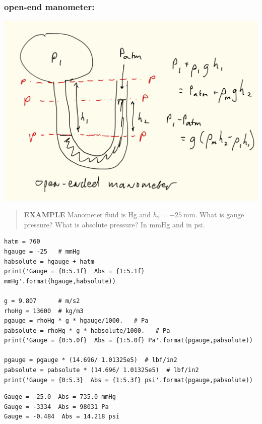 \documentclass[11pt]{article}
\begin{document}
\subsubsection{open-end manometer:}
\label{sec-4-6-4}
\includegraphics[width=.9\linewidth]{./figs/Manometer-open.png}
\begin{quote}
\textbf{EXAMPLE} Manometer fluid is Hg and \(h_{2} = -\SI{25}{\mm}\).  What is gauge pressure?  What is absolute pressure? In mmHg and in psi.
\end{quote}
\begin{verbatim}
hatm = 760
hgauge = -25   # mmHg
habsolute = hgauge + hatm
print('Gauge = {0:5.1f}  Abs = {1:5.1f} mmHg'.format(hgauge,habsolute))

g = 9.807      # m/s2
rhoHg = 13600  # kg/m3
pgauge = rhoHg * g * hgauge/1000.   # Pa
pabsolute = rhoHg * g * habsolute/1000.   # Pa
print('Gauge = {0:5.0f}  Abs = {1:5.0f} Pa'.format(pgauge,pabsolute))

pgauge = pgauge * (14.696/ 1.01325e5)  # lbf/in2
pabsolute = pabsolute * (14.696/ 1.01325e5)  # lbf/in2
print('Gauge = {0:5.3}  Abs = {1:5.3f} psi'.format(pgauge,pabsolute))
\end{verbatim}

\begin{verbatim}
Gauge = -25.0  Abs = 735.0 mmHg
Gauge = -3334  Abs = 98031 Pa
Gauge = -0.484  Abs = 14.218 psi
\end{verbatim}
\end{document}
